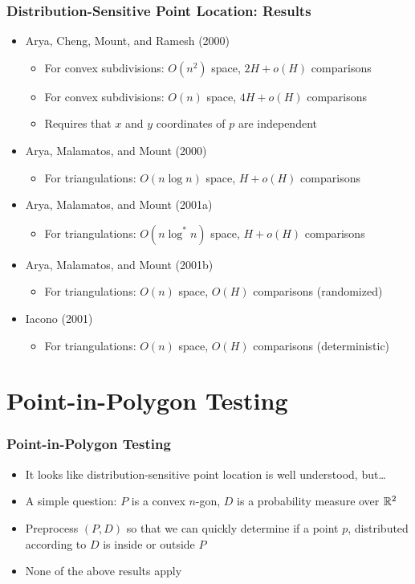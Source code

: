 \documentclass{beamer}
\begin{document}
\frame
{
   \frametitle{Distribution-Sensitive Point Location: Results}
   \begin{itemize}
   \item<1-> Arya, Cheng, Mount, and Ramesh (2000)
    \begin{itemize}
      \item<1->For convex subdivisions: $O(n^2)$ space, $2H+o(H)$ comparisons
      \item<1->For convex subdivisions: $O(n)$ space, $4H+o(H)$ comparisons
      \item<1->Requires that $x$ and $y$ coordinates of $p$ are independent
    \end{itemize}
   \item<2-> Arya, Malamatos, and Mount (2000)
    \begin{itemize}
      \item<2->For triangulations: $O(n\log n)$ space, $H+o(H)$ comparisons
    \end{itemize} 
    \item<3-> Arya, Malamatos, and Mount (2001a)
    \begin{itemize}
      \item<3->For triangulations: $O(n\log^* n)$ space, $H+o(H)$ comparisons
    \end{itemize} 
    \item<4-> Arya, Malamatos, and Mount (2001b)
    \begin{itemize}
      \item<4->For triangulations: $O(n)$ space, $O(H)$ comparisons (randomized)
    \end{itemize} 
    \item<5-> Iacono (2001)
    \begin{itemize}
      \item<5->For triangulations: $O(n)$ space, $O(H)$ comparisons (deterministic)
    \end{itemize} 
   \end{itemize}


}

\section{Point-in-Polygon Testing}
\frame
{
   \frametitle{Point-in-Polygon Testing}
   \begin{itemize}
   \item<1-> It looks like distribution-sensitive point location is 
	well understood, but\ldots
   \item<2-> A simple question: $P$ is a convex $n$-gon, $D$ is a
	probability measure over $\mathbb{R}^2$
   \item<3-> Preprocess $(P,D)$ so that we can quickly determine if a
point $p$, distributed according to $D$ is inside or outside $P$
   \item<4-> None of the above results apply
   \end{itemize}
}
\end{document}
